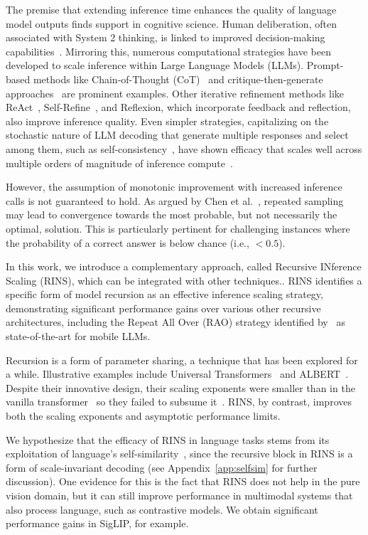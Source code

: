 The premise that extending inference time enhances the quality of language model outputs finds support in cognitive science. Human deliberation, often associated with System 2 thinking, is linked to improved decision-making capabilities~\cite{lawson2020comparing}. Mirroring this, numerous computational strategies have been developed to scale inference within Large Language Models (LLMs). Prompt-based methods like Chain-of-Thought (CoT)~\cite{cot_paper} and critique-then-generate approaches~\cite{ankner2024critiqueoutloudrewardmodels} are prominent examples. Other iterative refinement methods like ReAct~\cite{yao2023reactsynergizingreasoningacting}, Self-Refine~\cite{madaan2024self}, and Reflexion, which incorporate feedback and reflection, also improve inference quality. Even simpler strategies, capitalizing on the stochastic nature of LLM decoding that generate multiple responses and select among them, such as self-consistency~\cite{wang2023selfconsistencyimproveschainthought}, have shown efficacy that scales well across multiple orders of magnitude of inference compute~\cite{brown2024largelanguagemonkeysscaling}. 

However, the assumption of monotonic improvement with increased inference calls is not guaranteed to hold. As argued by Chen et al.~\cite{chen2024more}, repeated sampling may lead to convergence towards the most probable, but not necessarily the optimal, solution. This is particularly pertinent for challenging instances where the probability of a correct answer is below chance (i.e., $<0.5$).

In this work, we introduce a complementary approach, called Recursive INference Scaling (RINS), which can be integrated with other techniques.. RINS identifies a specific form of model recursion as an effective inference scaling strategy, demonstrating significant performance gains over various other recursive architectures, including the Repeat All Over (RAO) strategy identified by~\citet{liu2024mobilellm} as state-of-the-art for mobile LLMs. 

Recursion is a form of parameter sharing, a technique that has been explored for a while. Illustrative examples include Universal Transformers~\cite{dehghani2019universaltransformers} and ALBERT~\cite{lan2020albertlitebertselfsupervised}. Despite their innovative design, their scaling exponents were smaller than in the vanilla transformer~\citep{tay2022scaling} so they failed to subsume it~\citep{tay2022efficienttransformerssurvey}. RINS, by contrast, improves both the scaling exponents and asymptotic performance limits. 

We hypothesize that the efficacy of RINS in language tasks stems from its exploitation of language's self-similarity~\cite{alabdulmohsin2024fractalpatternsilluminatesuccess}, since the recursive block in RINS is a form of scale-invariant decoding (see Appendix~\ref{app:selfsim} for further discussion). One evidence for this is the fact that RINS does not help in the pure vision domain, but it can still improve performance in multimodal systems that also process language, such as contrastive models. We obtain significant performance gains in SigLIP, for example.